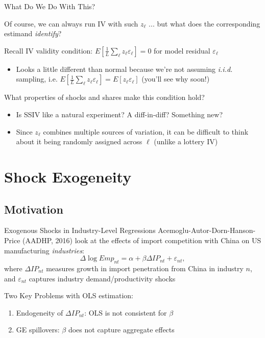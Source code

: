 \documentclass[t]{beamer}
\begin{document}
\begin{frame}{What Do We Do With This?}

Of course, we can always run IV with such $z_\ell$ ... but what does the corresponding estimand \emph{identify}?
\bigskip\pause

Recall IV validity condition: $E\left[\frac{1}{L}\sum_\ell z_\ell \varepsilon_\ell\right]=0$ for model residual $\varepsilon_\ell$\smallskip
\begin{itemize}
\item Looks a little different than normal because we're not assuming \emph{i.i.d.} sampling, i.e. $E\left[\frac{1}{L}\sum_\ell z_\ell \varepsilon_\ell\right]=E[z_\ell\varepsilon_\ell]$  (you'll see why soon!)
\end{itemize}
\bigskip\pause

What properties of shocks and shares make this condition hold?
\smallskip
\begin{itemize}
\item Is SSIV like a natural experiment? A diff-in-diff? Something new?
\item Since $z_\ell$ combines multiple sources of variation, it can be difficult to think about it being randomly assigned across $\ell$ (unlike a lottery IV)
\end{itemize}
\end{frame}

\section{Shock Exogeneity}

\subsection{Motivation}

\begin{frame}{Exogenous Shocks in Industry-Level Regressions}
Acemoglu-Autor-Dorn-Hanson-Price (AADHP, 2016) look at the effects of import competition with China on US manufacturing  \emph{industries}:
$$\Delta\log Emp_{nt}=\alpha+\beta \Delta IP_{nt}+\varepsilon_{nt}, $$
where $\Delta IP_{nt}$ measures growth in import penetration from China in industry $n$, and $\varepsilon_{nt}$ captures industry demand/productivity shocks
\pause\bigskip

Two Key Problems with OLS estimation:\smallskip
\begin{enumerate}
\item Endogeneity of $\Delta IP_{nt}$: OLS is not consistent for $\beta$
\smallskip
\item GE spillovers: $\beta$ does not capture aggregate effects
\end{enumerate}
\end{frame}
\end{document}
